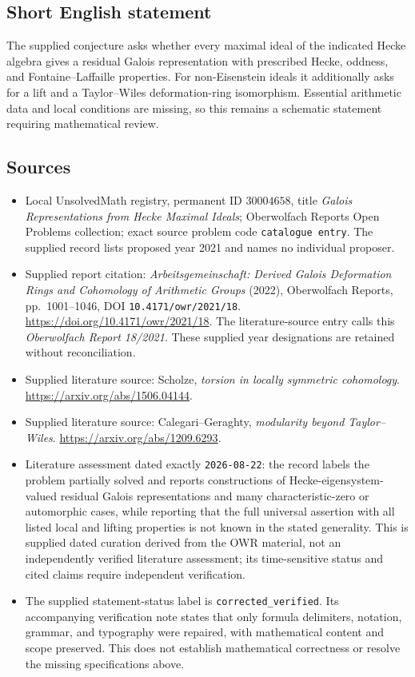 \documentclass[11pt]{article}
\begin{document}
\subsection{Short English statement}
The supplied conjecture asks whether every maximal ideal of the indicated Hecke algebra gives a residual Galois representation with prescribed Hecke, oddness, and Fontaine--Laffaille properties. For non-Eisenstein ideals it additionally asks for a lift and a Taylor--Wiles deformation-ring isomorphism. Essential arithmetic data and local conditions are missing, so this remains a schematic statement requiring mathematical review.
\subsection{Sources}
\begin{itemize}
\item Local UnsolvedMath registry, permanent ID \(30004658\), title \emph{Galois Representations from Hecke Maximal Ideals}; Oberwolfach Reports Open Problems collection; exact source problem code \texttt{catalogue entry}. The supplied record lists proposed year 2021 and names no individual proposer.
\item Supplied report citation: \emph{Arbeitsgemeinschaft: Derived Galois Deformation Rings and Cohomology of Arithmetic Groups} (2022), Oberwolfach Reports, pp.\ 1001--1046, DOI \texttt{10.4171/owr/2021/18}. \url{https://doi.org/10.4171/owr/2021/18}. The literature-source entry calls this \emph{Oberwolfach Report 18/2021}. These supplied year designations are retained without reconciliation.
\item Supplied literature source: Scholze, \emph{torsion in locally symmetric cohomology}. \url{https://arxiv.org/abs/1506.04144}.
\item Supplied literature source: Calegari--Geraghty, \emph{modularity beyond Taylor--Wiles}. \url{https://arxiv.org/abs/1209.6293}.
\item Literature assessment dated exactly \texttt{2026-08-22}: the record labels the problem partially solved and reports constructions of Hecke-eigensystem-valued residual Galois representations and many characteristic-zero or automorphic cases, while reporting that the full universal assertion with all listed local and lifting properties is not known in the stated generality. This is supplied dated curation derived from the OWR material, not an independently verified literature assessment; its time-sensitive status and cited claims require independent verification.
\item The supplied statement-status label is \texttt{corrected\_verified}. Its accompanying verification note states that only formula delimiters, notation, grammar, and typography were repaired, with mathematical content and scope preserved. This does not establish mathematical correctness or resolve the missing specifications above.
\end{itemize}
\end{document}
